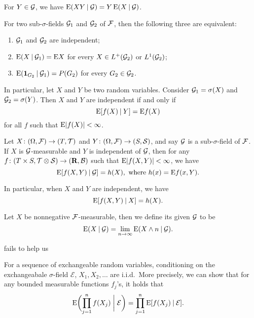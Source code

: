 \begin{prop}
    For $Y \in \mathcal{G}$, we have $\mathop{}\!\mathrm{E}(XY \mathbin{|} \mathcal{G}) = Y\mathop{}\!\mathrm{E}(X \mathbin{|} \mathcal{G})$.
\end{prop}

\begin{prop}
    For two sub-$\sigma$-fields $\mathcal{G}_1$ and $\mathcal{G}_2$ of $\mathcal{F}$, then the following three are equivalent:
    \begin{enumerate}
        \item $\mathcal{G}_1$ and $\mathcal{G}_2$ are independent;
        \item \label{enu:indep-sub-sigma-fields} $\mathop{}\!\mathrm{E}(X\mathbin{|} \mathcal{G}_1) = \mathop{}\!\mathrm{E} X$ for every $X \in L^+(\mathcal{G}_2)$ or $L^1(\mathcal{G}_2)$;
        \item $\mathop{}\!\mathrm{E}(\mathbf{1}_{G_2} \mathbin{|} \mathcal G_1) = P(G_2)$ for every $G_2 \in \mathcal{G}_2$.
    \end{enumerate}
\end{prop}

In particular, let $X$ and $Y$ be two random variables. Consider $\mathcal{G}_1 = \sigma(X)$ and $\mathcal{G}_2 = \sigma(Y)$. Then $X$ and $Y$ are independent if and only if \[
    \mathop{}\!\mathrm{E}[f(X) \mathbin{|} Y] = \mathop{}\!\mathrm{E} f(X)
\] for all $f$ such that $\mathop{}\!\mathrm{E} \lvert f(X) \rvert < \infty$.

\begin{prop}
    Let $X\colon (\Omega,\mathcal{F}) \to (T,\mathcal T)$ and $Y\colon (\Omega ,\mathcal{F}) \to (S,\mathcal S)$, and say $\mathcal{G}$ is a sub-$\sigma$-field of $\mathcal{F}$. If $X$ is $\mathcal{G}$-measurable and $Y$ is independent of $\mathcal{G}$, then for any $f\colon (T\times S ,\mathcal T\otimes \mathcal S) \to (\mathbf{R},\mathcal{B})$ such that $\mathop{}\!\mathrm{E}\lvert f(X,Y) \rvert < \infty$, we have \[
        \mathop{}\!\mathrm{E}[f(X,Y)\mathbin{|} \mathcal{G}] = h(X),\text{ where }h(x) = \mathop{}\!\mathrm{E} f(x,Y).
    \]
    
    In particular, when $X$ and $Y$ are independent, we have \[
        \mathop{}\!\mathrm{E}[f(X,Y)\mathbin{|} X] = h(X).
    \]
\end{prop}

\begin{defn}
    Let $X$ be nonnegative $\mathcal{F}$-measurable, then we define its  given $\mathcal{G}$ to be \[
        \mathop{}\!\mathrm{E}(X \mathbin{|} \mathcal{G}) = \lim_{n \to \infty} \mathop{}\!\mathrm{E}(X \land n \mathbin{|} \mathcal{G}).
    \]
\end{defn}

 fails to help us 




\begin{namedthm}
    For a sequence of exchangeable random variables, conditioning on the exchangeabale $\sigma$-field $\mathcal E$, $X_1,X_2,\dotsc$ are i.i.d.\ More precisely, we can show that for any bounded measurable functions $f_j$'s, it holds that \[
        \mathop{}\!\mathrm{E}\biggl(\prod_{j=1}^n f(X_j)\biggm\vert \mathcal E\biggr) = \prod_{j=1}^n \mathop{}\!\mathrm{E}[f(X_j) \mathbin{|} \mathcal E].
    \]
\end{namedthm}


